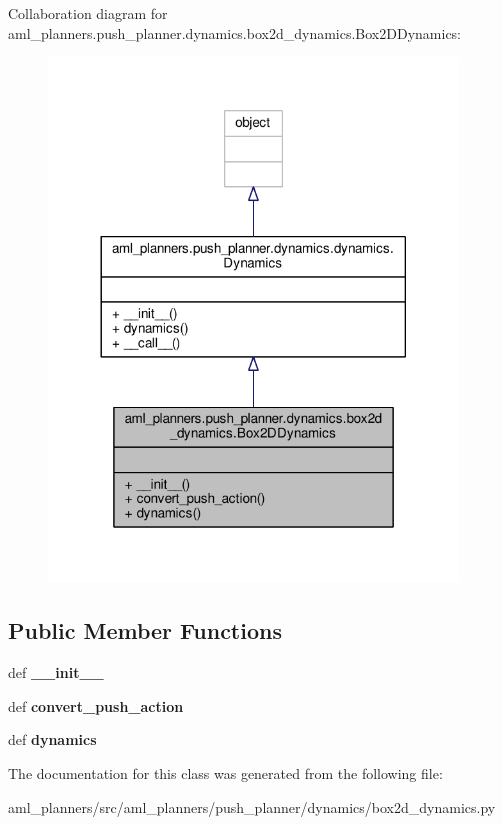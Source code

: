Collaboration diagram for aml\-\_\-planners.\-push\-\_\-planner.\-dynamics.\-box2d\-\_\-dynamics.\-Box2\-D\-Dynamics\-:\nopagebreak
\begin{figure}[H]
\begin{center}
\leavevmode
\includegraphics[width=308pt]{classaml__planners_1_1push__planner_1_1dynamics_1_1box2d__dynamics_1_1_box2_d_dynamics__coll__graph}
\end{center}
\end{figure}
\subsection*{Public Member Functions}
\begin{DoxyCompactItemize}
\item 
\hypertarget{classaml__planners_1_1push__planner_1_1dynamics_1_1box2d__dynamics_1_1_box2_d_dynamics_af99f33d0101270e778152f7b0dabe905}{def {\bfseries \-\_\-\-\_\-init\-\_\-\-\_\-}}\label{classaml__planners_1_1push__planner_1_1dynamics_1_1box2d__dynamics_1_1_box2_d_dynamics_af99f33d0101270e778152f7b0dabe905}

\item 
\hypertarget{classaml__planners_1_1push__planner_1_1dynamics_1_1box2d__dynamics_1_1_box2_d_dynamics_a55d07bb7180829e1e5e37f98a7471e91}{def {\bfseries convert\-\_\-push\-\_\-action}}\label{classaml__planners_1_1push__planner_1_1dynamics_1_1box2d__dynamics_1_1_box2_d_dynamics_a55d07bb7180829e1e5e37f98a7471e91}

\item 
\hypertarget{classaml__planners_1_1push__planner_1_1dynamics_1_1box2d__dynamics_1_1_box2_d_dynamics_a1d4739e2adbb9f88578ddc1e2e50397e}{def {\bfseries dynamics}}\label{classaml__planners_1_1push__planner_1_1dynamics_1_1box2d__dynamics_1_1_box2_d_dynamics_a1d4739e2adbb9f88578ddc1e2e50397e}

\end{DoxyCompactItemize}


The documentation for this class was generated from the following file\-:\begin{DoxyCompactItemize}
\item 
aml\-\_\-planners/src/aml\-\_\-planners/push\-\_\-planner/dynamics/box2d\-\_\-dynamics.\-py\end{DoxyCompactItemize}

